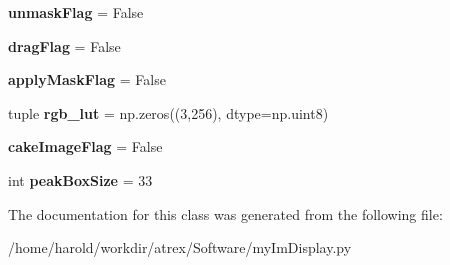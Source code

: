 \begin{DoxyCompactItemize}
\item 
\hypertarget{classmyImDisplay_1_1myImDisplay_a26c93c50e5e9d5f331d3f7c8de49bb73}{{\bfseries unmask\-Flag} = False}\label{classmyImDisplay_1_1myImDisplay_a26c93c50e5e9d5f331d3f7c8de49bb73}

\item 
\hypertarget{classmyImDisplay_1_1myImDisplay_a7b54134bda08a36bc55e9289b3c30b98}{{\bfseries drag\-Flag} = False}\label{classmyImDisplay_1_1myImDisplay_a7b54134bda08a36bc55e9289b3c30b98}

\item 
\hypertarget{classmyImDisplay_1_1myImDisplay_af326649460abba4d85c62746c570961f}{{\bfseries apply\-Mask\-Flag} = False}\label{classmyImDisplay_1_1myImDisplay_af326649460abba4d85c62746c570961f}

\item 
\hypertarget{classmyImDisplay_1_1myImDisplay_a4816a3cbcfb5ef0d5576395ee6c95c59}{tuple {\bfseries rgb\-\_\-lut} = np.\-zeros((3,256), dtype=np.\-uint8)}\label{classmyImDisplay_1_1myImDisplay_a4816a3cbcfb5ef0d5576395ee6c95c59}

\item 
\hypertarget{classmyImDisplay_1_1myImDisplay_a2d68517b926ed8a7ef02dc9053576197}{{\bfseries cake\-Image\-Flag} = False}\label{classmyImDisplay_1_1myImDisplay_a2d68517b926ed8a7ef02dc9053576197}

\item 
\hypertarget{classmyImDisplay_1_1myImDisplay_a0ea2cd018dee5f86a7740c76a7c08014}{int {\bfseries peak\-Box\-Size} = 33}\label{classmyImDisplay_1_1myImDisplay_a0ea2cd018dee5f86a7740c76a7c08014}

\end{DoxyCompactItemize}


The documentation for this class was generated from the following file\-:\begin{DoxyCompactItemize}
\item 
/home/harold/workdir/atrex/\-Software/my\-Im\-Display.\-py\end{DoxyCompactItemize}
